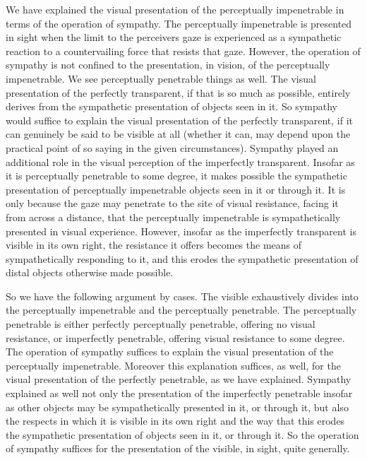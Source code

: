 We have explained the visual presentation of the perceptually impenetrable in terms of the operation of sympathy. The perceptually impenetrable is presented in sight when the limit to the perceivers gaze is experienced as a sympathetic reaction to a countervailing force that resists that gaze. However, the operation of sympathy is not confined to the presentation, in vision, of the perceptually impenetrable. We see perceptually penetrable things as well. The visual presentation of the perfectly transparent, if that is so much as possible, entirely derives from the sympathetic presentation of objects seen in it. So sympathy would suffice to explain the visual presentation of the perfectly transparent, if it can genuinely be said to be visible at all (whether it can, may depend upon the practical point of so saying in the given circumstances). Sympathy played an additional role in the visual perception of the imperfectly transparent. Insofar as it is perceptually penetrable to some degree, it makes possible the sympathetic presentation of perceptually impenetrable objects seen in it or through it. It is only because the gaze may penetrate to the site of visual resistance, facing it from across a distance, that the perceptually impenetrable is sympathetically presented in visual experience. However, insofar as the imperfectly transparent is visible in its own right, the resistance it offers becomes the means of sympathetically responding to it, and this erodes the sympathetic presentation of distal objects otherwise made possible. 

So we have the following argument by cases. The visible exhaustively divides into the perceptually impenetrable and the perceptually penetrable. The perceptually penetrable is either perfectly perceptually penetrable, offering no visual resistance, or imperfectly penetrable, offering visual resistance to some degree. The operation of sympathy suffices to explain the visual presentation of the perceptually impenetrable. Moreover this explanation suffices, as well, for the visual presentation of the perfectly penetrable, as we have explained. Sympathy explained as well not only the presentation of the imperfectly penetrable insofar as other objects may be sympathetically presented in it, or through it, but also the respects in which it is visible in its own right and the way that this erodes the sympathetic presentation of objects seen in it, or through it. So the operation of sympathy suffices for the presentation of the visible, in sight, quite generally.

